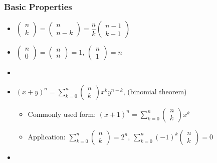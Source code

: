 \documentclass{beamer}
\begin{document}
\begin{frame}
    \frametitle{Basic Properties}
    \begin{itemize}
        \item $\begin{pmatrix} n\\k	\end{pmatrix} = \begin{pmatrix} n\\n-k	\end{pmatrix} = \dfrac{n}{k} \begin{pmatrix} n-1\\k-1 \end{pmatrix}$
        \item $\begin{pmatrix} n\\0	\end{pmatrix} = \begin{pmatrix} n\\n	\end{pmatrix} = 1$, $\begin{pmatrix} n\\1	\end{pmatrix} = n$
        \item {}
        \item $(x+y)^{n} = \sum\limits_{k=0}^{n}\begin{pmatrix} n\\k	\end{pmatrix} x^{k} y^{n-k}$, (binomial theorem)
            \begin{itemize}
                \item Commonly used form: $(x+1)^{n} = \sum\limits_{k=0}^{n}\begin{pmatrix} n\\k	\end{pmatrix} x^{k}$
                \item Application: $\sum\limits_{k=0}^{n}\begin{pmatrix} n\\k	\end{pmatrix} = 2^n$, $\sum\limits_{k=0}^{n} (-1)^k \begin{pmatrix} n\\k	\end{pmatrix} = 0$
            \end{itemize}
        \item {}
    \end{itemize}
\end{frame}
\end{document}
